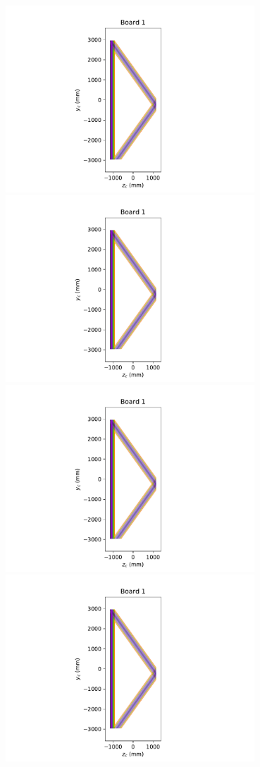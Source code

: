 \documentclass[pdftex,12pt,letter]{article}
\begin{document}
\begin{figure}[h]
  \centering

  \includegraphics[height=7cm,page=1,clip, trim=4cm 0 5cm 0]{test_plot_board.pdf}%
  \includegraphics[height=7cm,page=2,clip, trim=5cm 0 5cm 0]{test_plot_board.pdf}%
  \includegraphics[height=7cm,page=3,clip, trim=5cm 0 5cm 0]{test_plot_board.pdf}%
  \includegraphics[height=7cm,page=4,clip, trim=5cm 0 5cm 0]{test_plot_board.pdf}%

\end{figure}
\end{document}
